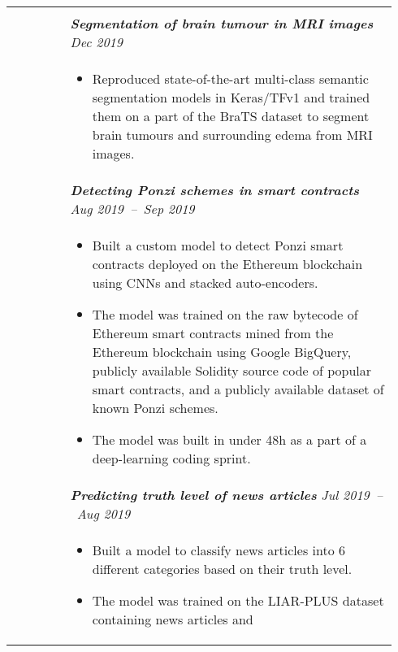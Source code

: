 \documentclass[letterpaper, 10pt, oneside]{article}
\newcommand{\bdit}[1]{\textit{\textbf{#1}}}
\begin{document}
\begin{longtable}{@{} p{0.14\linewidth} p{0.8\linewidth}}
{                  }
\\
                  & \bdit{Segmentation of brain tumour in MRI images} \hfill \textit{Dec 2019} \\
                  & \parbox{0.8\textwidth}{
                        \begin{itemize}[leftmargin=*, itemsep=-0.88ex]
                            \item Reproduced state-of-the-art multi-class semantic segmentation models in Keras/TFv1 and
                                trained them on a part of the BraTS dataset to segment brain tumours and surrounding edema from MRI images.
                        \end{itemize}
                    }  
\\
                  & \bdit{Detecting Ponzi schemes in smart contracts} \hfill \textit{Aug 2019\ --\ Sep 2019} \\
                  & \parbox{0.8\textwidth}{
                        \begin{itemize}[leftmargin=*, itemsep=-0.88ex]
                            \item Built a custom model to detect Ponzi smart contracts deployed on the Ethereum blockchain
                                using CNNs and stacked auto-encoders. 
                            \item The model was trained on the raw bytecode of Ethereum smart contracts mined from the Ethereum blockchain 
                                  using Google BigQuery, publicly available Solidity source code of popular smart contracts, 
                                  and a publicly available dataset of known Ponzi schemes.
                            \item The model was built in under 48h as a part of a deep-learning coding sprint.
                        \end{itemize}
                    }  
\\
                  & \bdit{Predicting truth level of news articles} \hfill \textit{Jul 2019\ --\ Aug 2019} \\
                  & \parbox{0.8\textwidth}{
                        \begin{itemize}[leftmargin=*, itemsep=-0.88ex]
                            \item Built a model to classify news articles into 6 different categories based on their truth level.
                            \item The model was trained on the LIAR-PLUS dataset containing news articles and

\end{itemize}}
\end{longtable}
\end{document}
